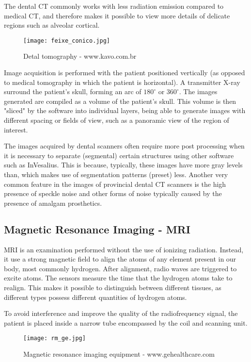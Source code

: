 The dental CT commonly works with less radiation emission compared to medical CT, and therefore makes it possible to view more details of delicate regions such as alveolar cortical.

\begin{figure}[!htb]
\centering
\texttt{[image: feixe\_conico.jpg]}
\caption{Detal tomography - www.kavo.com.br}
\end{figure}

Image acquisition is performed with the patient positioned vertically (as opposed to medical tomography in which the patient is horizontal). A transmitter X-ray surround the patient's skull, forming an arc of $180^\circ$ or $360^\circ$. The images generated are compiled as a volume of the patient's skull. This volume is then "sliced" by the software into individual layers, being able to generate images with different spacing or fields of view, such as a panoramic view of the region of interest.

The images acquired by dental scanners often require more post processing when it is necessary to separate (segmental) certain structures using other software such as InVesalius. This is because, typically, these images have more gray levels than, which makes use of segmentation patterns (preset) less. Another very common feature in the images of provincial dental CT scanners is the high presence of speckle noise and other forms of noise typically caused by the presence of amalgam prosthetics.

\subsection{Magnetic Resonance Imaging - MRI}

MRI is an examination performed without the use of ionizing radiation. Instead, it use a strong magnetic field to align the atoms of any element present in our body, most commonly hydrogen. After alignment, radio waves are triggered to excite atoms. The sensors measure the time that the hydrogen atoms take to realign. This makes it possible to distinguish between different tissues, as different types possess different quantities of hydrogen atoms.

To avoid interference and improve the quality of the radiofrequency signal, the patient is placed inside a narrow tube encompassed by the coil and scanning unit.

\begin{figure}[!htb]
\centering
\texttt{[image: rm\_ge.jpg]}
\caption{Magnetic resonance imaging equipment - www.gehealthcare.com}
\end{figure}

